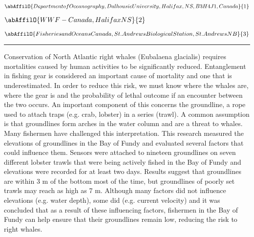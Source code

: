 \begin{center}
   \vspace{2 mm} \begin{center}
    \vspace{2 mm}\begin{center}
  
  $\abAffilO{Department of Oceanography, Dalhousie University, Halifax, NS, B3H 4J1, Canada}{1}$

  
  $\abAffilO{WWF-Canada, Halifax NS}{2}$

  
  $\abAffilO{Fisheries and Oceans Canada, St. Andrews Biological Station, St. Andrews NB}{3}$

  \end{center}
  \vspace{2 mm}
  \end{center}\end{center}
  \begin{center}\rule{0.70\linewidth}{0.5 pt}\end{center}

\noindent Conservation of North Atlantic right whales (Eubalaena glacialis) requires mortalities caused by human activities to be significantly reduced. Entanglement in fishing gear is considered an important cause of mortality and one that is underestimated. In order to reduce this risk, we must know where the whales are, where the gear is and the probability of lethal outcome if an encounter between the two occurs. An important component of this concerns the groundline, a rope used to attach traps (e.g. crab, lobster) in a series (trawl). A common assumption is that groundlines form arches in the water column and are a threat to whales. Many fishermen have challenged this interpretation. This research measured the elevations of groundlines in the Bay of Fundy and evaluated several factors that could influence them. Sensors were attached to nineteen groundlines on seven different lobster trawls that were being actively fished in the Bay of Fundy and elevations were recorded for at least two days. Results suggest that groundlines are within 3 m of the bottom most of the time, but groundlines of poorly set trawls may reach as high as 7 m. Although many factors did not influence elevations (e.g. water depth), some did (e.g. current velocity) and it was concluded that as a result of these influencing factors, fishermen in the Bay of Fundy can help ensure that their groundlines remain low, reducing the risk to right whales.

